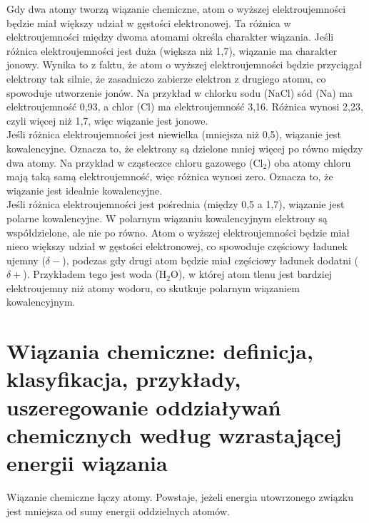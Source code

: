 \documentclass{article}
\begin{document}
Gdy dwa atomy tworzą wiązanie chemiczne, atom o wyższej elektroujemności będzie miał większy udział w gęstości elektronowej. Ta różnica w elektroujemności między dwoma atomami określa charakter wiązania. Jeśli różnica elektroujemności jest duża (większa niż 1,7), wiązanie ma charakter jonowy. Wynika to z faktu, że atom o wyższej elektroujemności będzie przyciągał elektrony tak silnie, że zasadniczo zabierze elektron z drugiego atomu, co spowoduje utworzenie jonów. Na przykład w chlorku sodu (NaCl) sód (Na) ma elektroujemność 0,93, a chlor (Cl) ma elektroujemność 3,16. Różnica wynosi 2,23, czyli więcej niż 1,7, więc wiązanie jest jonowe. \\
Jeśli różnica elektroujemności jest niewielka (mniejsza niż 0,5), wiązanie jest kowalencyjne. Oznacza to, że elektrony są dzielone mniej więcej po równo między dwa atomy. Na przykład w cząsteczce chloru gazowego (Cl$_2$) oba atomy chloru mają taką samą elektroujemność, więc różnica wynosi zero. Oznacza to, że wiązanie jest idealnie kowalencyjne.\\
Jeśli różnica elektroujemności jest pośrednia (między 0,5 a 1,7), wiązanie jest polarne kowalencyjne. W polarnym wiązaniu kowalencyjnym elektrony są współdzielone, ale nie po równo. Atom o wyższej elektroujemności będzie miał nieco większy udział w gęstości elektronowej, co spowoduje częściowy ładunek ujemny ($\delta -$), podczas gdy drugi atom będzie miał częściowy ładunek dodatni ($\delta +$). Przykładem tego jest woda (H$_2$O), w której atom tlenu jest bardziej elektroujemny niż atomy wodoru, co skutkuje polarnym wiązaniem kowalencyjnym.

\section{Wiązania chemiczne: definicja, klasyfikacja, przykłady, uszeregowanie oddziaływań chemicznych według wzrastającej energii wiązania}

Wiązanie chemiczne łączy atomy. Powstaje, jeżeli energia utowrzonego związku jest mniejsza od sumy energii oddzielnych atomów.
\end{document}
